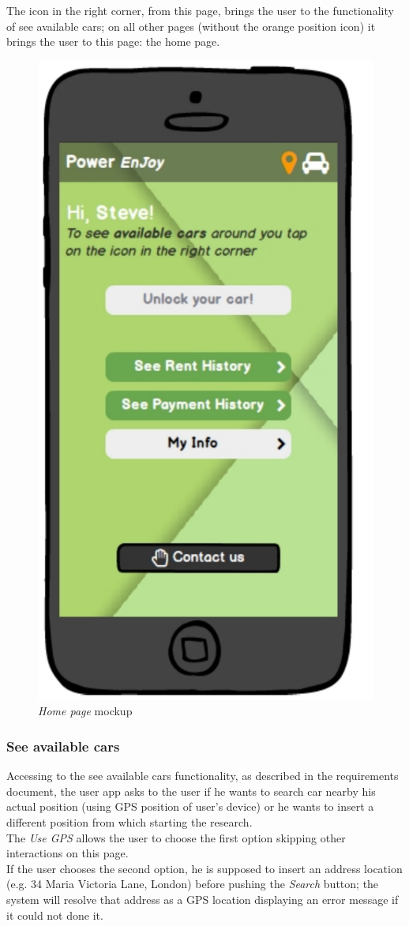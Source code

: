 The icon in the right corner, from this page, brings the user to the functionality of see available cars; on all other pages (without the orange position icon) it brings the user to this page: the home page.

	\begin{figure}[h]
			\centering
			\includegraphics[width=0.4\linewidth]{mockups/homePage}
			\caption{
				\label{fig:homePage} 
				\emph{Home page} mockup 
			}
		\end{figure}
		
\subsubsection{See available cars}
Accessing to the see available cars functionality, as described in the requirements document, the user app asks to the user if he wants to search car nearby his actual position (using GPS position of user's device) or he wants to insert a different position from which starting the research. \\

The \emph{Use GPS} allows the user to choose the first option skipping other interactions on this page. \\

If the user chooses the second option, he is supposed to insert an address location (e.g. 34 Maria Victoria Lane, London) before pushing the \emph{Search} button; the system will resolve that address as a GPS location displaying an error message if it could not done it. \\

